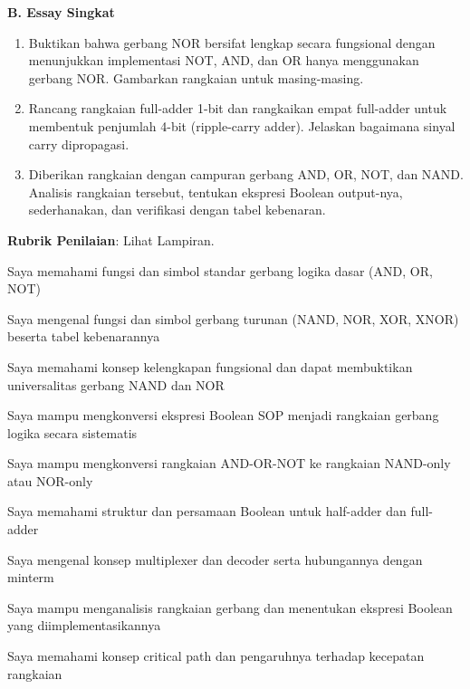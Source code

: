 \documentclass[../main]{subfiles}
\begin{document}
\begin{asesmen}
\textbf{B. Essay Singkat}
\begin{enumerate}
  \item Buktikan bahwa gerbang NOR bersifat lengkap secara fungsional dengan menunjukkan implementasi NOT, AND, dan OR hanya menggunakan gerbang NOR. Gambarkan rangkaian untuk masing-masing.
  \item Rancang rangkaian full-adder 1-bit dan rangkaikan empat full-adder untuk membentuk penjumlah 4-bit (ripple-carry adder). Jelaskan bagaimana sinyal carry dipropagasi.
  \item Diberikan rangkaian dengan campuran gerbang AND, OR, NOT, dan NAND. Analisis rangkaian tersebut, tentukan ekspresi Boolean output-nya, sederhanakan, dan verifikasi dengan tabel kebenaran.
\end{enumerate}

\textbf{Rubrik Penilaian}: Lihat Lampiran.
\end{asesmen}


\begin{checklist}
  \item Saya memahami fungsi dan simbol standar gerbang logika dasar (AND, OR, NOT)
  \item Saya mengenal fungsi dan simbol gerbang turunan (NAND, NOR, XOR, XNOR) beserta tabel kebenarannya
  \item Saya memahami konsep kelengkapan fungsional dan dapat membuktikan universalitas gerbang NAND dan NOR
  \item Saya mampu mengkonversi ekspresi Boolean SOP menjadi rangkaian gerbang logika secara sistematis
  \item Saya mampu mengkonversi rangkaian AND-OR-NOT ke rangkaian NAND-only atau NOR-only
  \item Saya memahami struktur dan persamaan Boolean untuk half-adder dan full-adder
  \item Saya mengenal konsep multiplexer dan decoder serta hubungannya dengan minterm
  \item Saya mampu menganalisis rangkaian gerbang dan menentukan ekspresi Boolean yang diimplementasikannya
  \item Saya memahami konsep critical path dan pengaruhnya terhadap kecepatan rangkaian
\end{checklist}

\end{document}
